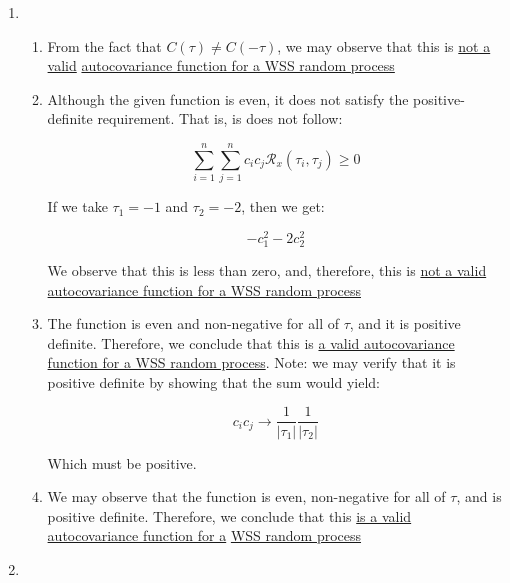 \begin{enumerate}
\begin{enumerate}
      \item 

      \item 

    \end{enumerate}

  \item

    \begin{enumerate}

      \item From the fact that $C(\tau)\neq C(-\tau)$, we may observe that this is \underline{not a valid} \underline{autocovariance function for a WSS random process}

      \item Although the given function is even, it does not satisfy the positive-definite requirement. That is, is does not follow:

        $$\sum_{i=1}^n\sum_{j=1}^n c_ic_j\mathcal{R}_x(\tau_i,\tau_j)\geq 0$$

        If we take $\tau_1=-1$ and $\tau_2=-2$, then we get:

        $$-c_1^2-2c_2^2$$

      We observe that this is less than zero, and, therefore, this is \underline{not a valid}\\ \underline{autocovariance function for a WSS random process}

      \item The function is even and non-negative for all of $\tau$, and it is positive definite. Therefore, we conclude that this is \underline{a valid autocovariance function for a WSS random process}. Note: we may verify that it is positive definite by showing that the sum would yield:

        $$c_ic_j\to \frac{1}{|\tau_1|}\frac{1}{|\tau_2|}$$

      Which must be positive.

      \item We may observe that the function is even, non-negative for all of $\tau$, and is positive definite. Therefore, we conclude that this \underline{is a valid autocovariance function for a} \underline{WSS random process}

    \end{enumerate}

  \item

    \begin{enumerate}


\end{enumerate}
\end{enumerate}
